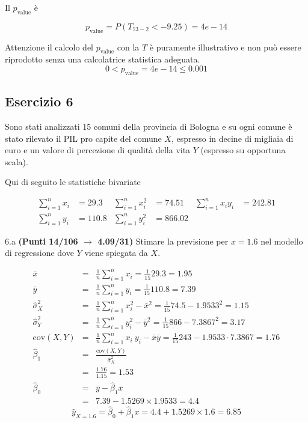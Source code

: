 \documentclass[
  11pt,
]{book}
\theoremstyle{mytheoremstyle}
\theoremstyle{mydefstyle}
\newenvironment{sol}
  {
  \begin{tcolorbox}[enhanced,breakable,arc=0.1mm,boxrule=1pt,colback=white,colframe=iblue,
  title=\bf \fontfamily{lmss}\selectfont \hspace{.5 cm} Soluzione,drop fuzzy shadow]

}{
\end{tcolorbox}
  }
\begin{document}
\begin{sol}
Il \(p_{\text{value}}\) è

\[ p_{\text{value}} = P(T_{73-2}<-9.25)=4e-14 \]

Attenzione il calcolo del \(p_\text{value}\) con la \(T\) è puramente illustrativo e non può essere riprodotto senza una calcolatrice statistica adeguata.\[
 0 < p_\text{value}= 4e-14 \leq 0.001 
\]

\end{sol}

\subsection{Esercizio 6}\label{esercizio-6-15}

Sono stati analizzati 15 comuni della provincia di Bologna e su ogni comune è stato rilevato
il PIL pro capite del comune \(X\), espresso in decine di migliaia di euro e un valore di percezione di
qualità della vita \(Y\) (espresso su opportuna scala).

Qui di seguito le statistiche bivariate

\begin{align*}
  \sum_{i=1}^n x_i &= 29.3 &\sum_{i=1}^n x_i^2 &= 74.51 &\sum_{i=1}^n x_i y_i &= 242.81\\
  \sum_{i=1}^n y_i &= 110.8 & \sum_{i=1}^n y_i^2 &= 866.02 &
\end{align*}

6.a \textbf{(Punti 14/106 \(\rightarrow\) 4.09/31)} Stimare la previsione per \(x=1.6\) nel modello di regressione dove \(Y\) viene spiegata da \(X\).

\begin{sol}
\begin{eqnarray*}
           \bar x &=&\frac 1 n\sum_{i=1}^n x_i = \frac {1}{ 15 }  29.3 =  1.95 \\
           \bar y &=&\frac 1 n\sum_{i=1}^n y_i = \frac {1}{ 15 }  110.8 =  7.39 \\
           \hat\sigma_X^2&=&\frac 1 n\sum_{i=1}^n x_i^2-\bar x^2=\frac {1}{ 15 }  74.5  - 1.9533 ^2= 1.15 \\
           \hat\sigma_Y^2&=&\frac 1 n\sum_{i=1}^n y_i^2-\bar y^2=\frac {1}{ 15 }  866  - 7.3867 ^2= 3.17 \\
           \text{cov}(X,Y)&=&\frac 1 n\sum_{i=1}^n x_i~y_i-\bar x\bar y=\frac {1}{ 15 }  243 - 1.9533 \cdot 7.3867 = 1.76 \\
           \hat\beta_1 &=& \frac{\text{cov}(X,Y)}{\hat\sigma_X^2} \\
                    &=& \frac{ 1.76 }{ 1.15 }  =  1.53 \\
           \hat\beta_0 &=& \bar y - \hat\beta_1 \bar x\\
                    &=&  7.39 - 1.5269 \times  1.9533 = 4.4 
         \end{eqnarray*}\[\hat y_{X= 1.6 }=\hat\beta_0+\hat\beta_1 x= 4.4 + 1.5269 \times 1.6 = 6.85 \]

\end{sol}
\end{document}
